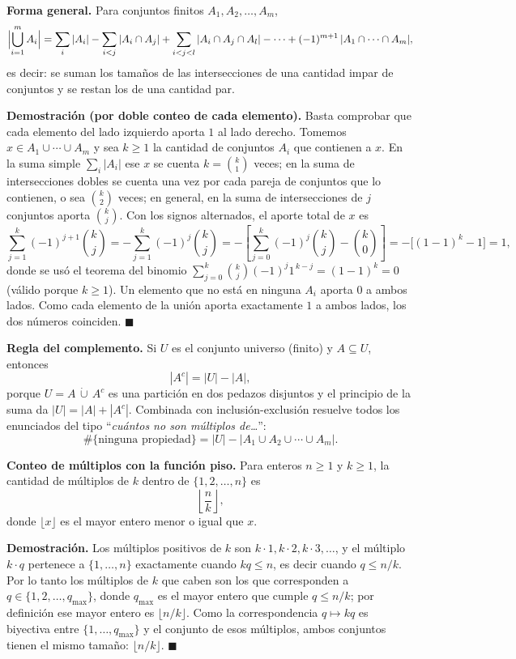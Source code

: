 \documentclass[11pt]{article}
\begin{document}
\begin{teo}
\smallskip
\textbf{Forma general.} Para conjuntos finitos $A_1,A_2,\dots,A_m$,
\[
\Bigl|\bigcup_{i=1}^{m} A_i\Bigr|
= \sum_{i} |A_i| - \sum_{i<j} |A_i\cap A_j| + \sum_{i<j<l} |A_i\cap A_j\cap A_l| - \cdots + (-1)^{m+1}\,|A_1\cap\cdots\cap A_m| ,
\]
es decir: se suman los tamaños de las intersecciones de una cantidad impar de conjuntos y se restan los de una cantidad par.

\smallskip
\textbf{Demostración (por doble conteo de cada elemento).} Basta comprobar que cada elemento del lado izquierdo aporta $1$ al lado derecho. Tomemos $x\in A_1\cup\cdots\cup A_m$ y sea $k\ge 1$ la cantidad de conjuntos $A_i$ que contienen a $x$. En la suma simple $\sum_i |A_i|$ ese $x$ se cuenta $k=\binom{k}{1}$ veces; en la suma de intersecciones dobles se cuenta una vez por cada pareja de conjuntos que lo contienen, o sea $\binom{k}{2}$ veces; en general, en la suma de intersecciones de $j$ conjuntos aporta $\binom{k}{j}$. Con los signos alternados, el aporte total de $x$ es
\[
\sum_{j=1}^{k}(-1)^{j+1}\binom{k}{j}
= -\sum_{j=1}^{k}(-1)^{j}\binom{k}{j}
= -\left[\sum_{j=0}^{k}(-1)^{j}\binom{k}{j} - \binom{k}{0}\right]
= -\bigl[(1-1)^k - 1\bigr] = 1 ,
\]
donde se usó el teorema del binomio $\sum_{j=0}^k \binom{k}{j}(-1)^j 1^{\,k-j} = (1-1)^k = 0$ (válido porque $k\ge 1$). Un elemento que no está en ninguna $A_i$ aporta $0$ a ambos lados. Como cada elemento de la unión aporta exactamente $1$ a ambos lados, los dos números coinciden. $\blacksquare$

\smallskip
\textbf{Regla del complemento.} Si $U$ es el conjunto universo (finito) y $A\subseteq U$, entonces
\[
|A^{c}| = |U| - |A| ,
\]
porque $U = A\,\dot\cup\,A^{c}$ es una partición en dos pedazos disjuntos y el principio de la suma da $|U|=|A|+|A^c|$. Combinada con inclusión-exclusión resuelve todos los enunciados del tipo ``\emph{cuántos no son múltiplos de\ldots}'':
\[
\#\{\text{ninguna propiedad}\} = |U| - |A_1\cup A_2\cup\cdots\cup A_m| .
\]

\smallskip
\textbf{Conteo de múltiplos con la función piso.} Para enteros $n\ge 1$ y $k\ge 1$, la cantidad de múltiplos de $k$ dentro de $\{1,2,\dots,n\}$ es
\[
\left\lfloor \frac{n}{k} \right\rfloor ,
\]
donde $\lfloor x\rfloor$ es el mayor entero menor o igual que $x$.

\smallskip
\textbf{Demostración.} Los múltiplos positivos de $k$ son $k\cdot 1, k\cdot 2, k\cdot 3,\dots$, y el múltiplo $k\cdot q$ pertenece a $\{1,\dots,n\}$ exactamente cuando $k q\le n$, es decir cuando $q\le n/k$. Por lo tanto los múltiplos de $k$ que caben son los que corresponden a $q\in\{1,2,\dots,q_{\max}\}$, donde $q_{\max}$ es el mayor entero que cumple $q\le n/k$; por definición ese mayor entero es $\lfloor n/k\rfloor$. Como la correspondencia $q\mapsto kq$ es biyectiva entre $\{1,\dots,q_{\max}\}$ y el conjunto de esos múltiplos, ambos conjuntos tienen el mismo tamaño: $\lfloor n/k\rfloor$. $\blacksquare$


\end{teo}
\end{document}
